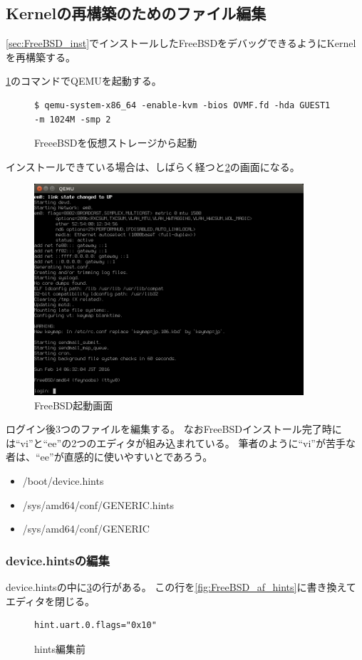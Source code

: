 \documentclass[a4j]{jarticle}
\begin{document}
\subsection{Kernelの再構築のためのファイル編集}
\ref{sec:FreeBSD_inst}でインストールしたFreeBSDをデバッグできるようにKernelを再構築する。

\ref{fig:FreeBSD_boot_com}のコマンドでQEMUを起動する。
\begin{figure}[htbp]
	\centering
	\begin{lstlisting}[basicstyle=\ttfamily\footnotesize, frame=single, breaklines=true]
$ qemu-system-x86_64 -enable-kvm -bios OVMF.fd -hda GUEST1 -m 1024M -smp 2
    \end{lstlisting}
	\caption{FreeeBSDを仮想ストレージから起動}
	\label{fig:FreeBSD_boot_com}
\end{figure}

インストールできている場合は、しばらく経つと\ref{fig:FreeBSD_BOOT}の画面になる。
\begin{figure}[htbp]
	\centering
	\includegraphics[width=10cm]{./IMG/FreeBSD_BOOT.png}
    \caption{FreeBSD起動画面}
    \label{fig:FreeBSD_BOOT}
\end{figure}

ログイン後3つのファイルを編集する。
なおFreeBSDインストール完了時には``vi''と``ee''の2つのエディタが組み込まれている。
筆者のように``vi''が苦手な者は、``ee''が直感的に使いやすいとであろう。
\begin{itemize}
    \item /boot/device.hints
    \item /sys/amd64/conf/GENERIC.hints
    \item /sys/amd64/conf/GENERIC
\end{itemize}

\subsubsection{device.hintsの編集}
\label{sec:FreeBSD_device.hints}
device.hintsの中に\ref{fig:FreeBSD_bf_hints}の行がある。
この行を\ref{fig:FreeBSD_af_hints}に書き換えてエディタを閉じる。
\begin{figure}[htbp]
	\centering
	\begin{lstlisting}[basicstyle=\ttfamily\footnotesize, frame=single, breaklines=true]
hint.uart.0.flags="0x10"
	\end{lstlisting}
	\caption{hints編集前}
	\label{fig:FreeBSD_bf_hints}
\end{figure}
\end{document}

